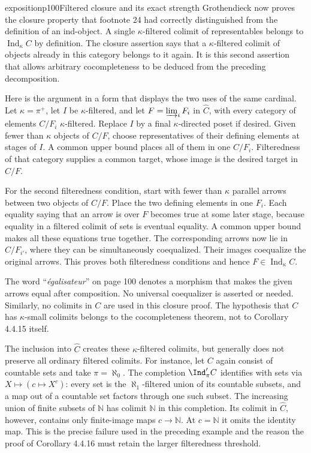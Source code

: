 \begin{dcomment}{exposition}{p100}{Filtered closure and its exact strength}
Grothendieck now proves the closure property that footnote 24 had correctly distinguished from the definition of an ind-object. A single $\kappa$-filtered colimit of representables belongs to $\operatorname{Ind}_\kappa C$ by definition. The closure assertion says that a $\kappa$-filtered colimit of objects already in this category belongs to it again. It is this second assertion that allows arbitrary cocompleteness to be deduced from the preceding decomposition.

Here is the argument in a form that displays the two uses of the same cardinal. Let $\kappa=\pi^+$, let $I$ be $\kappa$-filtered, and let $F=\varinjlim_iF_i$ in $\widehat C$, with every category of elements $C/F_i$ $\kappa$-filtered. Replace $I$ by a final $\kappa$-directed poset if desired. Given fewer than $\kappa$ objects of $C/F$, choose representatives of their defining elements at stages of $I$. A common upper bound places all of them in one $C/F_i$. Filteredness of that category supplies a common target, whose image is the desired target in $C/F$.

For the second filteredness condition, start with fewer than $\kappa$ parallel arrows between two objects of $C/F$. Place the two defining elements in one $F_i$. Each equality saying that an arrow is over $F$ becomes true at some later stage, because equality in a filtered colimit of sets is eventual equality. A common upper bound makes all these equations true together. The corresponding arrows now lie in $C/F_{i'}$, where they can be simultaneously coequalized. Their images coequalize the original arrows. This proves both filteredness conditions and hence $F\in\operatorname{Ind}_\kappa C$.

The word ``\emph{égalisateur}'' on page 100 denotes a morphism that makes the given arrows equal after composition. No universal coequalizer is asserted or needed. Similarly, no colimits in $C$ are used in this closure proof. The hypothesis that $C$ has $\kappa$-small colimits belongs to the cocompleteness theorem, not to Corollary 4.4.15 itself.

The inclusion into $\widehat C$ creates these $\kappa$-filtered colimits, but generally does not preserve all ordinary filtered colimits. For instance, let $C$ again consist of countable sets and take $\pi=\aleph_0$. The completion $\Ind'_\pi C$ identifies with sets via $X\mapsto(c\mapsto X^c)$: every set is the $\aleph_1$-filtered union of its countable subsets, and a map out of a countable set factors through one such subset. The increasing union of finite subsets of $\mathbb N$ has colimit $\mathbb N$ in this completion. Its colimit in $\widehat C$, however, contains only finite-image maps $c\to\mathbb N$. At $c=\mathbb N$ it omits the identity map. This is the precise failure used in the preceding example and the reason the proof of Corollary 4.4.16 must retain the larger filteredness threshold.
\end{dcomment}

